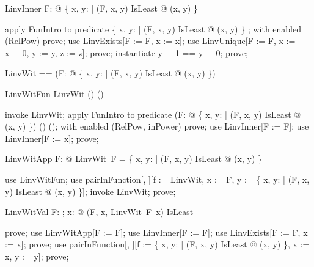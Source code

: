 \documentclass{article}
\begin{document}
\begin{theorem}{LinvInner}
  \forall F: \nat \fun \nat @ \{ x, y: \nat | (F, x, y) \in IsLeast @ (x, y) \} \in \nat \fun \nat
\end{theorem}

\begin{zproof}
apply FunIntro to predicate \{ x, y: \nat | (F, x, y) \in IsLeast @ (x, y) \} \in \nat \fun \nat;
with enabled (RelPow) prove;
use LinvExists[F := F, x := x];
use LinvUnique[F := F, x := x\_\_0, y := y, z := z];
prove;
instantiate y\_\_1 == y\_\_0;
prove;
\end{zproof}

\begin{zed}
  LinvWit == (\lambda F: \nat \fun \nat @ \{ x, y: \nat | (F, x, y) \in IsLeast @ (x, y) \})
\end{zed}

\begin{theorem}{LinvWitFun}
  LinvWit \in (\nat \fun \nat) \fun (\nat \fun \nat)
\end{theorem}

\begin{zproof}
invoke LinvWit;
apply FunIntro to predicate (\lambda F: \nat \fun \nat @ \{ x, y: \nat | (F, x, y) \in IsLeast @ (x, y) \}) \in (\nat \fun \nat) \fun (\nat \fun \nat);
with enabled (RelPow, inPower) prove;
use LinvInner[F := F];
use LinvInner[F := x];
prove;
\end{zproof}

\begin{theorem}{LinvWitApp}
  \forall F: \nat \fun \nat @ LinvWit~F = \{ x, y: \nat | (F, x, y) \in IsLeast @ (x, y) \}
\end{theorem}

\begin{zproof}
use LinvWitFun;
use pairInFunction[\nat \fun \nat, \nat \fun \nat][f := LinvWit, x := F, y := \{ x, y: \nat | (F, x, y) \in IsLeast @ (x, y) \}];
invoke LinvWit;
prove;
\end{zproof}

\begin{theorem}{LinvWitVal}
  \forall F: \nat \fun \nat; x: \nat @ (F, x, LinvWit~F~x) \in IsLeast
\end{theorem}

\begin{zproof}
prove;
use LinvWitApp[F := F];
use LinvInner[F := F];
use LinvExists[F := F, x := x];
prove;
use pairInFunction[\nat, \nat][f := \{ x, y: \nat | (F, x, y) \in IsLeast @ (x, y) \}, x := x, y := y];
prove;
\end{zproof}
\end{document}
